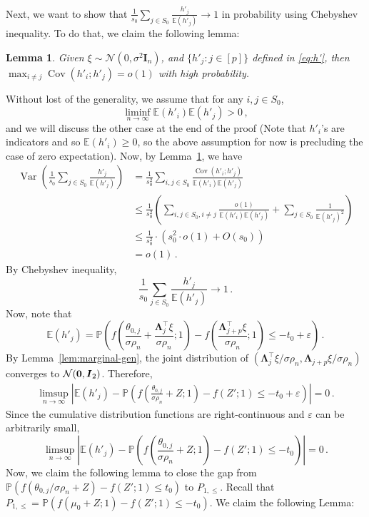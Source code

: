 \documentclass[11pt]{article}
\DeclareMathOperator{\Var}{Var}
\DeclareMathOperator{\Cov}{Cov}
\newtheorem{lemma}{Lemma}%
\newcommand{\bI}{\boldsymbol{I}}
\newcommand{\bLambda}{\boldsymbol{\Lambda}}
\newcommand{\mcN}{\mathcal{N}}
\newcommand{\Expected}{\mathbb{E}}
\newcommand{\Prob}{\mathbb{P}}
\begin{document}
Next, we want to show that $\frac{1}{s_0}\sum_{j\in S_0}\frac{h'_j}{\Expected(h'_j)}\to 1$ in probability using Chebyshev inequality. To do that, we claim the following lemma:
\begin{lemma}\label{lem:h'j-Cov}
    Given $\xi\sim \mcN(0,\sigma^2\bI_n)$, and $\{h'_j:j\in[p]\}$ defined in \eqref{eq:h'}, then $\max_{i\neq j}\Cov(h'_i;h'_j)=o(1)$ with high probability.
\end{lemma}
Without lost of the generality, we assume that for any $i,j\in S_0$, 
\[
\liminf_{n\to\infty}\Expected(h'_i)\Expected(h'_j)>0\,,
\]
and we will discuss the other case at the end of the proof (Note that $h'_i$'s are indicators and so $\Expected(h'_i)\ge0$, so the above assumption for now is precluding the case of zero expectation). Now, by Lemma~\ref{lem:h'j-Cov}, we have
\begin{align*}
    \Var\left(\frac{1}{s_0}\sum_{j\in S_0}\frac{h'_j}{\Expected(h'_j)}\right) &= \frac{1}{s_0^2}\sum_{i,j\in S_0}\frac{\Cov(h'_i;h'_j)}{\Expected(h'_i)\Expected(h'_j)}\\
    &\leq  \frac{1}{s_0^2}\left(\sum_{i,j\in S_0,i\neq j}\frac{o(1)}{\Expected(h'_i)\Expected(h'_j)}+\sum_{j\in S_0}\frac{1}{\Expected(h'_j)^2}\right)\\
    &\leq \frac{1}{s_0^2}\cdot\left( s_0^2\cdot o(1)+O(s_0)\right)\\
    &=  o(1)\,.
\end{align*}
By Chebyshev inequality, 
\[
\frac{1}{s_0}\sum_{j\in S_0}\frac{h'_j}{\Expected(h'_j)}\to 1\,.
\]
Now, note that 
\[
\Expected(h'_j) = \Prob\left(f\left(\frac{\theta_{0,j}}{\sigma\rho_n}+\frac{\bLambda_j^\top\xi}{\sigma\rho_n};1\right)-f\left(\frac{\bLambda_{j+p}^\top\xi}{\sigma\rho_n};1\right)\leq -t_0 +\varepsilon\right)\,.
\]
By Lemma~\ref{lem:marginal-gen}, the joint distribution of $(\bLambda_j^\top \xi/\sigma\rho_n,\bLambda_{j+p}\xi/\sigma\rho_n)$ converges to $\mcN({{\bf{0}}},\bI_2)$. Therefore,  
\begin{align*}
    \limsup_{n\to\infty}\left|\Expected(h'_j)-\Prob\left(f\left(\frac{\theta_{0,j}}{\sigma\rho_n}+Z;1\right)-f\left(Z';1\right)\leq -t_0 +\varepsilon\right)\right|=0\,.
\end{align*}
Since the cumulative distribution functions are right-continuous and $\varepsilon$ can be arbitrarily small,
\[
\limsup_{n\to\infty}\left|\Expected(h'_j)-\Prob\left(f\left(\frac{\theta_{0,j}}{\sigma\rho_n}+Z;1\right)-f\left(Z';1\right)\leq -t_0\right)\right|=0\,.
\]
Now, we claim the following lemma to close the gap from $\Prob(f(\theta_{0,j}/\sigma\rho_n+Z)-f(Z';1)\le t_0)$ to $P_{1,\leq}$. Recall that $P_{1,\leq}= \Prob(f(\mu_0+Z;1)-f(Z';1)\leq -t_0)$. We claim the following Lemma:
\end{document}
